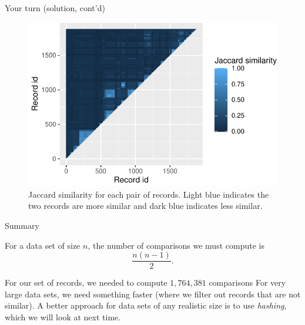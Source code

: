 \documentclass[
  ignorenonframetext,
]{beamer}
\begin{document}
\begin{frame}{Your turn (solution, cont'd)}
\protect\hypertarget{your-turn-solution-contd-1}{}

\begin{figure}
\centering
\includegraphics{probabilistic-blocking-partI_files/figure-beamer/your-turn2-plot-again-1.pdf}
\caption{Jaccard similarity for each pair of records. Light blue
indicates the two records are more similar and dark blue indicates less
similar.}
\end{figure}

\end{frame}

\begin{frame}{Summary}
\protect\hypertarget{summary}{}

For a data set of size \(n\), the number of comparisons we must compute
is \[\frac{n(n-1)}{2}.\]

\vfill

For our set of records, we needed to compute \(1,764,381\) comparisons
\vfill For very large data sets, we need something faster (where we
filter out records that are not similar). \vfill A better approach for
data sets of any realistic size is to use \emph{hashing}, which we will
look at next time. \vfill

\end{frame}
\end{document}
